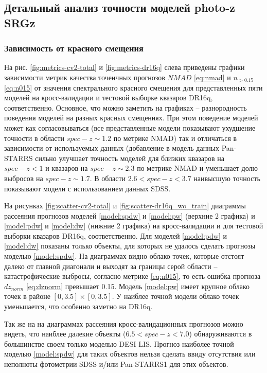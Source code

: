 \documentclass[fleqn,usenatbib]{mnras}
\begin{document}
\subsection{Детальный анализ точности моделей photo-z SRGz}

\subsubsection{Зависимость от красного смещения}\label{ssec:accuracy-as-fzspec}

На рис. \ref{fig:metrics-cv2-total} и \ref{fig:metrics-dr16q} слева приведены графики зависимости метрик качества точенчных прогнозов $NMAD$ \eqref{eq:nmad} и $n_{>0.15}$ \eqref{eq:n015} от значения спектрального красного смещения для представленных пяти моделей на кросс-валидации и тестовой выборке квазаров DR16q, соответственно. Основное, что можно заметить на графиках -- разнородность поведения моделей на разных красных смещениях. При этом поведение моделей может как согласовываться (все представленные модели показывают ухудшение точности в области $spec-z \sim 1.2$ по метрике NMAD) так и отличаться в зависимости от используемых данных (добавление в модель данных Pan-STARRS сильно улучшает точность моделей для близких квазаров на $spec-z < 1$ и квазаров на $spec-z \sim 2.3$ по метрике NMAD и уменьшает долю выбросов на $spec-z \sim 1.7$. В области $2.6 < spec-z < 3.7$ наивысшую точность показывают модели с использованием данных SDSS.

На рисунках \ref{fig:scatter-cv2-total} и \ref{fig:scatter-dr16q_wo_train} диаграммы рассеяния прогнозов моделей \ref{model:spdw} и \ref{model:pw} (верхние 2 графика) и \ref{model:pdw} и \ref{model:dw} (нижние 2 графика) на кросс-валидации и для тестовой выборки квазаров DR16q, соответственно. Для моделей \ref{model:pdw} и \ref{model:dw} показаны только объекты, для которых не удалось сделать прогнозы моделью \ref{model:spdw}. На диаграммах видно облако точек, которые отстоят далеко от главной диагонали и выходят за границы серой области -- катастрофические выбросы, согласно метрике \eqref{eq:n015}, то есть ошибка прогноза $dz_{norm}$ \eqref{eq:dznorm} превышает 0.15. Модель \ref{model:pw} имеет крупное облако точек в районе $[0, 3.5] \times [0, 3.5]$. У наиблее точной модели облако точек уменьшается, что особенно заметно на DR16q.

Так же на на диаграммах рассеяния кросс-валидационных прогнозов можно видеть, что наиблее далекие объекты ($6.5 < spec-z < 7.0$) обнаруживаются в большинстве своем только моделью DESI LIS. Прогноз наиболее точной моделью \ref{model:spdw} для таких объектов нельзя сделать ввиду отсутствия или неполноты фотометрии SDSS и/или Pan-STARRS1 для этих объектов.
\end{document}
